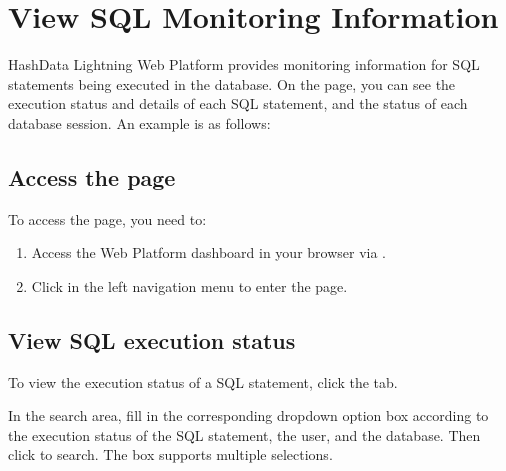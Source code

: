 \documentclass[letterpaper,10pt,english]{sphinxmanual}
\begin{document}
\sphinxstepscope


\section{View SQL Monitoring Information}
\label{\detokenize{manage-system/web-platform-monitoring/web-platform-sql-monitor-info:view-sql-monitoring-information}}\label{\detokenize{manage-system/web-platform-monitoring/web-platform-sql-monitor-info::doc}}
\sphinxAtStartPar
HashData Lightning Web Platform provides monitoring information for SQL statements being executed in the database. On the  page, you can see the execution status and details of each SQL statement,  and the status of each database session. An example is as follows:

\noindent{}


\subsection{Access the page}
\label{\detokenize{manage-system/web-platform-monitoring/web-platform-sql-monitor-info:access-the-page}}
\sphinxAtStartPar
To access the  page, you need to:
\begin{enumerate}
%
\item {} 
\sphinxAtStartPar
Access the Web Platform dashboard in your browser via .

\item {} 
\sphinxAtStartPar
Click  in the left navigation menu to enter the page.

\end{enumerate}


\subsection{View SQL execution status}
\label{\detokenize{manage-system/web-platform-monitoring/web-platform-sql-monitor-info:view-sql-execution-status}}
\sphinxAtStartPar
To view the execution status of a SQL statement, click the  tab.

\sphinxAtStartPar
In the search area, fill in the corresponding drop\sphinxhyphen{}down option box according to the execution status of the SQL statement, the user, and the database. Then click  to search. The  box supports multiple selections.
\end{document}
